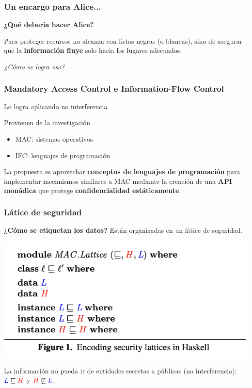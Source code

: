 \documentclass{beamer}
\begin{document}
\begin{frame}
    \frametitle{Un encargo para Alice...}
    \textbf{¿Qué debería hacer Alice?}\newline

    Para proteger recursos no alcanza con listas negras (o blancas), sino de asegurar que la {\textbf<2->{información fluye}} solo hacia los lugares adecuados.\newline
    \pause

    \begin{flushright}
        \it{¿Cómo se logra eso?}
    \end{flushright}

\end{frame}

\begin{frame}
    \frametitle{Mandatory Access Control e Information-Flow Control}
    Lo logra aplicando no interferencia\newline

    Provienen de la investigación
    \begin{itemize}
        \item MAC: sistemas operativos
        \item IFC: lenguajes de programación
    \end{itemize}
    \hspace{1cm}

    La propuesta es aprovechar \textbf{conceptos de lenguajes de programación} para implementar mecanismos similares a MAC mediante la creación de una \textbf{API monádica} que protege \textbf{confidencialidad estáticamente}.

\end{frame}

\begin{frame}
    \frametitle{Látice de seguridad}
    \textbf{¿Cómo se etiquetan los datos?}
    Están organizadas en un látice de seguridad.
    \begin{center}
        \includegraphics[scale=0.8]{figure1.png}
    \end{center}
    La información no pueda ir de entidades secretas a públicas (no interferencia): $\textcolor{blue}{L} \sqsubseteq \textcolor{red}{H}$ y $\textcolor{red}{H} \not\sqsubseteq \textcolor{blue}{L}$.
\end{frame}
\end{document}
